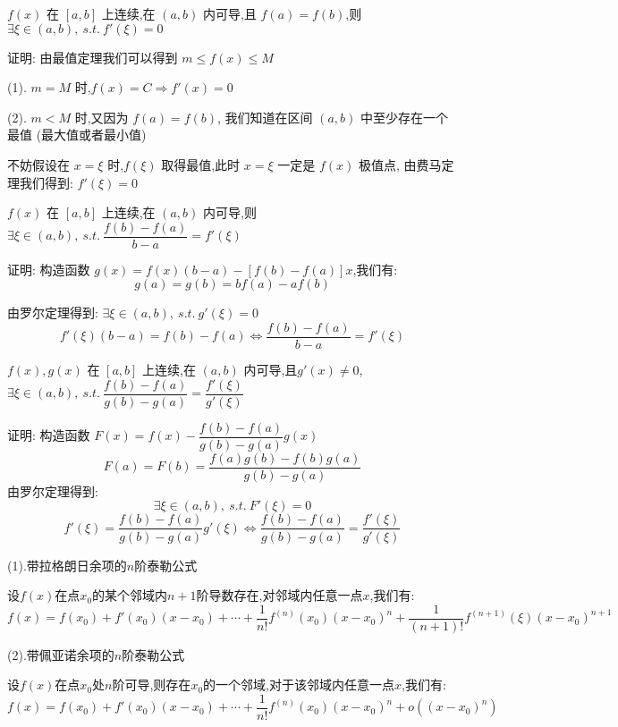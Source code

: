 \begin{theorem}[罗尔定理]

	$f(x)$ 在 $[a,b]$ 上连续,在 $(a,b)$ 内可导,且 $f(a)=f(b)$,则 $\exists \xi\in(a,b),\ s.t.\ f'(\xi)=0$

	证明: 由最值定理我们可以得到 $m\leq f(x)\leq M$

	(1). $m=M$ 时,$f(x) = C \Rightarrow f'(x)=0$

	(2). $m<M$ 时,又因为 $f(a)=f(b)$, 我们知道在区间 $(a,b)$ 中至少存在一个最值 (最大值或者最小值)

	不妨假设在 $x=\xi$ 时,$f(\xi)$ 取得最值,此时 $x=\xi$ 一定是 $f(x)$ 极值点, 由费马定理我们得到: $f'(\xi)=0$

\end{theorem}
\begin{theorem}[拉格朗日中值定理]

	$f(x)$ 在 $[a,b]$ 上连续,在 $(a,b)$ 内可导,则 $\exists \xi\in(a,b),\ s.t.\ \dfrac{f(b)-f(a)}{b-a}=f'(\xi)$

	证明: 构造函数 $g(x)=f(x)(b-a)-[f(b)-f(a)]x$,我们有:
	$$g(a)=g(b)=bf(a)-af(b)$$

	由罗尔定理得到:
	$\exists \xi\in(a,b),\ s.t.\ g'(\xi)=0$
	$$ f'(\xi)(b-a)=f(b)-f(a)\Leftrightarrow  \frac{f(b)-f(a)}{b-a}=f'(\xi)$$
\end{theorem}
\begin{theorem}[柯西中值定理]

	$f(x),g(x)$ 在 $[a,b]$ 上连续,在 $(a,b)$ 内可导,且$g'(x)\neq 0$,$\exists \xi\in(a,b),\ s.t.\ \dfrac{f(b)-f(a)}{g(b)-g(a)}=\dfrac{f'(\xi)}{g'(\xi)}$

	证明: 构造函数 $F(x)=f(x)-\dfrac{f(b)-f(a)}{g(b)-g(a)}g(x)$
	$$F(a)=F(b)=\frac{f(a)g(b)-f(b)g(a)}{g(b)-g(a)}$$
	由罗尔定理得到: $$\exists \xi\in(a,b),\ s.t.\ F'(\xi)=0$$
	$$ f'(\xi)=\frac{f(b)-f(a)}{g(b)-g(a)}g'(\xi)\Leftrightarrow  \frac{f(b)-f(a)}{g(b)-g(a)}=\frac{f'(\xi)}{g'(\xi)}$$
\end{theorem}
\begin{theorem}[泰勒公式]

	(1).带拉格朗日余项的$n$阶泰勒公式

	设$f(x)$在点$x_{0}$的某个邻域内$n+1$阶导数存在,对邻域内任意一点$x$,我们有:
	$$f(x)=f(x_{0})+f'(x_{0})(x-x_{0})+\cdots+\frac{1}{n!}f^{(n)}(x_{0})(x-x_{0})^{n}+\frac{1}{(n+1)!}f^{(n+1)}(\xi)(x-x_{0})^{n+1}$$

	(2).带佩亚诺余项的$n$阶泰勒公式

	设$f(x)$在点$x_{0}$处$n$阶可导,则存在$x_{0}$的一个邻域,对于该邻域内任意一点$x$,我们有:
	$$f(x)=f(x_{0})+f'(x_{0})(x-x_{0})+\cdots+\frac{1}{n!}f^{(n)}(x_{0})(x-x_{0})^{n}+o((x-x_{0})^n)$$
\end{theorem}
